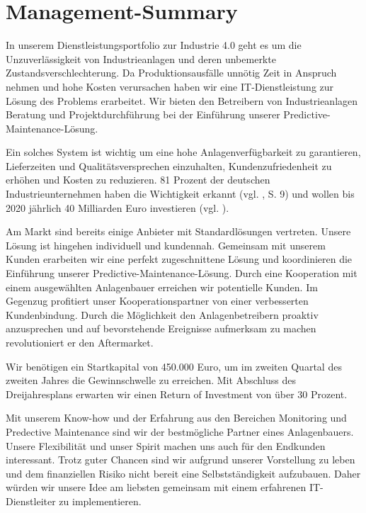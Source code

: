 \section{Management-Summary}

In unserem Dienstleistungsportfolio zur Industrie 4.0 geht es um die Unzuverlässigkeit von Industrieanlagen und deren unbemerkte Zustandsverschlechterung. Da Produktionsausfälle unnötig Zeit in Anspruch nehmen und hohe Kosten verursachen haben wir eine IT-Dienstleistung zur Lösung des Problems erarbeitet. Wir bieten den Betreibern von Industrieanlagen Beratung und Projektdurchführung bei der Einführung unserer Predictive-Maintenance-Lösung.

Ein solches System ist wichtig um eine hohe Anlagenverfügbarkeit zu garantieren, Lieferzeiten und Qualitätsversprechen einzuhalten, Kundenzufriedenheit zu erhöhen und Kosten zu reduzieren. 81 Prozent der deutschen Industrieunternehmen haben die Wichtigkeit erkannt (vgl. \cite{SasForsa}, S. 9) und wollen bis 2020 jährlich 40 Milliarden Euro investieren (vgl. \cite{IndustrieHohesPotenzial}).

Am Markt sind bereits einige Anbieter mit Standardlösungen vertreten. Unsere Lösung ist hingehen individuell und kundennah. Gemeinsam mit unserem Kunden erarbeiten wir eine perfekt zugeschnittene Lösung und koordinieren die Einführung unserer Predictive-Maintenance-Lösung. Durch eine Kooperation mit einem ausgewählten Anlagenbauer erreichen wir potentielle Kunden. Im Gegenzug profitiert unser Kooperationspartner von einer verbesserten Kundenbindung. Durch die Möglichkeit den Anlagenbetreibern proaktiv anzusprechen und auf bevorstehende Ereignisse aufmerksam zu machen revolutioniert er den Aftermarket.

Wir benötigen ein Startkapital von 450.000 Euro, um im zweiten Quartal des zweiten Jahres die Gewinnschwelle zu erreichen. Mit Abschluss des Dreijahresplans erwarten wir einen Return of Investment von über 30  Prozent.

Mit unserem Know-how und der Erfahrung aus den Bereichen Monitoring und Predective Maintenance sind wir der bestmögliche Partner eines Anlagenbauers. Unsere Flexibilität und unser Spirit machen uns auch für den Endkunden interessant. Trotz guter Chancen sind wir aufgrund unserer Vorstellung zu leben und dem finanziellen Risiko nicht bereit eine Selbstständigkeit aufzubauen. Daher würden wir unsere Idee am liebsten gemeinsam mit einem erfahrenen IT-Dienstleiter zu implementieren.
